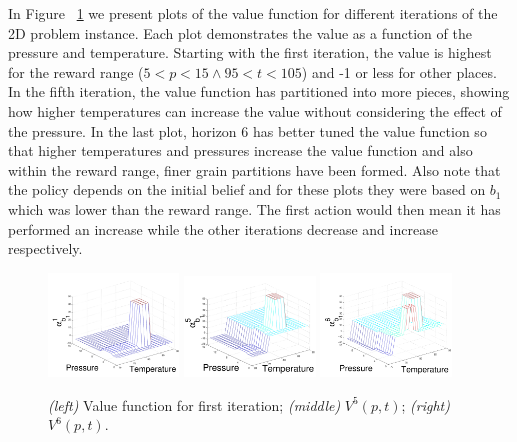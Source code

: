 \documentclass{article} %
\begin{document}
In Figure ~\ref{fig:3D}  we present plots of the value function for different iterations of the 2D problem instance. Each plot demonstrates the value as a function of the pressure and temperature. Starting with the first iteration, the value is highest for the reward range ($5<p<15 \wedge 95<t<105$) and -1 or less for other places. In the fifth iteration, the value function has partitioned into more pieces, showing how higher temperatures can increase the value without considering the effect of the pressure. In the last plot, horizon 6 has better tuned the value function so that higher temperatures and pressures increase the value function and also within the reward range, finer grain partitions have been formed. Also note that the policy depends on the initial belief and for these plots they were based on $b_1$ which was lower than the reward range. The first action would then mean it has performed an increase while the other iterations decrease and increase respectively.  
\begin{figure}[tbp!]
\vspace{-2mm}
\centering
\includegraphics[width=0.31\textwidth]{pics/2d1.pdf}
\includegraphics[width=0.31\textwidth]{pics/2d9.pdf}
\includegraphics[width=0.31\textwidth]{pics/2d111.pdf}
\vspace{-3mm}
\caption{\footnotesize 
{\it (left)} Value function for first iteration; 
{\it (middle)} $V^5(p,t)$; 
{\it (right)} $V^6(p,t)$.
}
\label{fig:3D}
\vspace{-4mm}
\end{figure}
\end{document}
